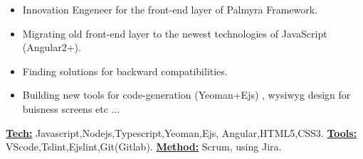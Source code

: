 \documentclass[10pt,a4paper]{altacv}
\begin{document}

\begin{fullwidth}
\makecvheader
\end{fullwidth}



\begin{itemize}
\item Innovation Engeneer for the front-end layer of Palmyra Framework.
\item Migrating old front-end layer to the newest technologies of JavaScript (Angular2+).
\item Finding solutions for backward compatibilities.
\item Building new tools for code-generation (Yeoman+Ejs) , wysiwyg design for buisness screens etc ...
\end{itemize}
\underline{\textbf{Tech:}} Javascript,Nodejs,Typescript,Yeoman,Ejs, Angular,HTML5,CSS3.
\newline
\underline{\textbf{Tools:}} VScode,Tslint,Ejslint,Git(Gitlab).
\newline
\underline{\textbf{Method:}} Scrum, using Jira.
\divider
\end{document}
